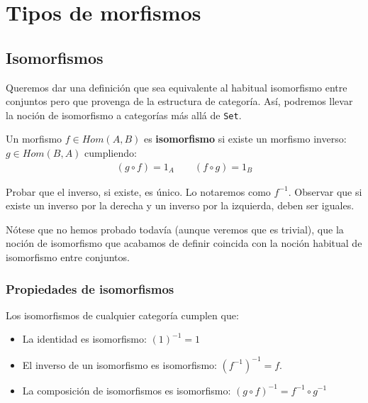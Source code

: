 \documentclass[11pt, fleqn, spanish]{book}
\begin{document}
\chapter{Tipos de morfismos}

\section {Isomorfismos}
Queremos dar una definición que sea equivalente al habitual
isomorfismo entre conjuntos pero que provenga de la estructura de
categoría. Así, podremos llevar la noción de isomorfismo a categorías
más allá de \texttt{Set}.

\begin{definition}
  Un morfismo $f \in Hom(A,B)$ es \textbf{isomorfismo} si existe un morfismo inverso:
  $g \in Hom(B,A)$ cumpliendo:
  \begin{gather*}
    (g \circ f) = 1_A \qquad (f \circ g) = 1_B
  \end{gather*}
\end{definition}
  
\begin{exercise} 
  Probar que el inverso, si existe, es único. Lo notaremos como $f^{-1}$. Observar que si
  existe un inverso por la derecha y un inverso por la izquierda, deben ser iguales.
\end{exercise}

Nótese que no hemos probado todavía (aunque veremos que es trivial),
que la noción de isomorfismo que acabamos de definir coincida con la
noción habitual de isomorfismo entre conjuntos.


\subsection{Propiedades de isomorfismos}
\begin{theorem}
  Los isomorfismos de cualquier categoría cumplen que:
  
  \begin{itemize}
  \item La identidad es isomorfismo: $(1)^{-1} = 1$ 
  \item El inverso de un isomorfismo es isomorfismo: $(f^{-1})^{-1} = f$.
  \item La composición de isomorfismos es isomorfismo: $(g \circ f)^{-1} = f^{-1} \circ g^{-1}$
  \end{itemize}

\end{theorem}
\end{document}
